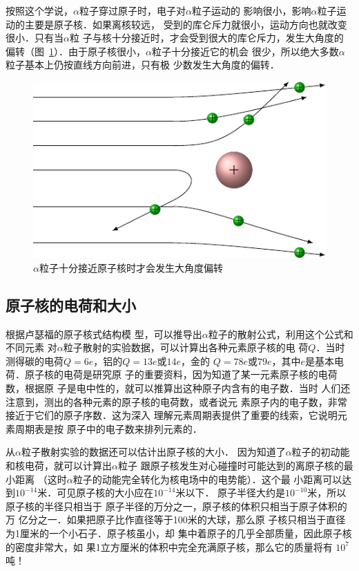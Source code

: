 按照这个学说，$\alpha$粒子穿过原子时，电子对$\alpha$粒子运动的
影响很小，影响$\alpha$粒子运动的主要是原子核．如果离核较远，
受到的库仑斥力就很小，运动方向也就改变很小．只有当$\alpha$粒
子与核十分接近时，才会受到很大的库仑斥力，发生大角度的
偏转（图~\ref{fig_C_8-3}）．由于原子核很小，$\alpha$粒子十分接近它的机会
很少，所以绝大多数$\alpha$粒子基本上仍按直线方向前进，只有极
少数发生大角度的偏转．
\begin{figure}[htbp]
    \centering
    \includegraphics{fig/C/8-3.pdf}
    \caption{$\alpha$粒子十分接近原子核时才会发生大角度偏转}\label{fig_C_8-3}
\end{figure}


\subsection{原子核的电荷和大小} 

根据卢瑟福的原子核式结构模
型，可以推导出$\alpha$粒子的散射公式，利用这个公式和不同元素
对$\alpha$粒子散射的实验数据，可以计算出各种元素原子核的电
荷$Q$．当时测得碳的电荷$Q=6e$，铝的$Q=13e$或$14e$，金的
$Q=78e$或$79e$，其中$e$是基本电荷．原子核的电荷是研究原
子的重要资料，因为知道了某一元素原子核的电荷数，根据原
子是电中性的，就可以推算出这种原子内含有的电子数．当时
人们还注意到，测出的各种元素的原子核的电荷数，或者说元
素原子内的电子数，非常接近于它们的原子序数．这为深入
理解元素周期表提供了重要的线索，它说明元素周期表是按
原子中的电子数来排列元素的．

从$\alpha$粒子散射实验的数据还可以估计出原子核的大小．
因为知道了$\alpha$粒子的初动能和核电荷，就可以计算出$\alpha$粒子
跟原子核发生对心碰撞时可能达到的离原子核的最小距离
（这时$\alpha$粒子的动能完全转化为核电场中的电势能）．这个最
小距离可以达到$10^{-14}$米．可见原子核的大小应在$10^{-14}$米以下．
原子半径大约是$10^{-10}$米，所以原子核的半径只相当于
原子半径的万分之一，原子核的体积只相当于原子体积的万
亿分之一．如果把原子比作直径等于100米的大球，那么原
子核只相当于直径为1厘米的一个小石子．原子核虽小，却
集中着原子的几乎全部质量，因此原子核的密度非常大，如
果1立方厘米的体积中完全充满原子核，那么它的质量将有
$10^7$吨！

